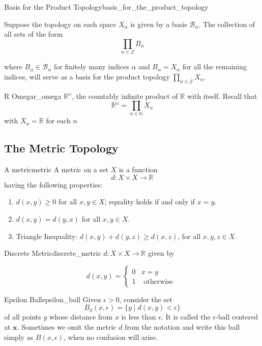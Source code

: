 \begin{theorem}{Basis for the Product Topology}{basis_for_the_product_topology}

Suppose the topology on each space $X_{\alpha}$ is given by a basis $\mathcal{B}_{\alpha}$. The collection of all sets of the form
\[
\prod_{\alpha \in \mathcal{ J } } B_{\alpha}
\]

where $B_{\alpha} \in \mathcal{ B } _{\alpha}$ for finitely many indices $\alpha$ and $B_{\alpha}=X_{\alpha}$ for all the remaining indices, will serve as a basis for the product topology $\prod_{\alpha \in \mathcal{ J } } X_{\alpha}$.
\end{theorem}

\begin{definition}{R Omega}{r_omega}
$\mathbb{R}^{\omega}$, the countably infinite product of $\mathbb{R}$ with itself. Recall that
\[
    \mathbb{R}^{\omega}=\prod_{n \in \mathbb{N}} X_{n}
\]
with $ X_{ n }  =  \mathbb{R}  $ for each $ n $ 
\end{definition}


\subsection{The Metric Topology}

\begin{definition}{A metric}{metric}
A metric on a set $X$ is a function
\[
    d: X \times X \to \mathbb{R} 
\]
having the following properties:
\begin{enumerate}
       \item $d(x, y) \geq 0$ for all $x, y \in X$; equality holds if and only if $x=y$.
       \item $d(x, y)=d(y, x)$ for all $x, y \in X$.
       \item Triangle Inequality: $d(x, y)+d(y, z) \geq d(x, z)$, for all $x, y, z \in X$.
\end{enumerate}
\end{definition}

\begin{example}{Discrete Metric}{discrete_metric}
 $d: X \times X \rightarrow \mathbb{R}$ given by

\[
d(x, y)= \begin{cases}0 & x=y \\ 1 & \text { otherwise }\end{cases}
\]
\end{example}


\begin{definition}{Epsilon Ball}{epsilon_ball}
Given $\epsilon>0$, consider the set
\[
B_{d}(x, \epsilon)=\{y \mid d(x, y)<\epsilon\}
\]
of all points $y$ whose distance from $x$ is less than $\epsilon$. It is called the $\epsilon$-ball centered at $\boldsymbol{x}$. Sometimes we omit the metric $d$ from the notation and write this ball simply as $B(x, \epsilon)$, when no confusion will arise.
\end{definition}


